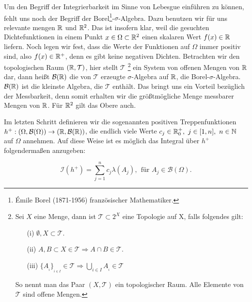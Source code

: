 Um den Begriff der Integrierbarkeit im Sinne von Lebesgue einführen zu können, fehlt uns noch der Begriff der Borel\footnote{Émile Borel (1871-1956)  französischer Mathematiker.}-$\sigma$-Algebra. Dazu benutzen wir für uns relevante mengen $\mathbb{R}$ und $\mathbb{R}^2$. Das ist insofern klar, weil die gesuchten Dichtefunktionen in einem Punkt $x \in \Omega \subset \mathbb{R}^2$ einen skalaren Wert $f(x) \in \mathbb{R}$ liefern. Noch legen wir fest, dass die Werte der Funktionen auf $\Omega$ immer positiv sind, also $f(x) \in \mathbb{R}^+$, denn es gibt keine negativen Dichten. Betrachten wir den topologischen Raum $(\mathbb{R},\mathcal{T})$, hier stellt $\mathcal{T}$ \footnote{
Sei $X$ eine Menge, dann ist $\mathcal{T} \subset 2^{X}$ eine Topologie auf X, falls folgendes gilt:
\begin{itemize}
	\item[(i)] $\emptyset , X \subset \mathcal{T}$. 
	\item[(ii)] $ A,B \subset X \in \mathcal{T} \Rightarrow A \cap B \in \mathcal{T}$.
	\item[(iii)] $\{ A_{_i}\}_{_{i \in I}} \in \mathcal{T} \Rightarrow \bigcup\limits_{i \in I} A_{_i} \in \mathcal{T}$ 
\end{itemize}
So nennt man das Paar $(X, \mathcal{T})$ ein topologischer Raum. Alle Elemente von $\mathcal{T}$ sind offene Mengen.}
ein System von offenen Mengen von $\mathbb{R}$ dar, dann heißt $\mathcal{B}(\mathbb{R})$ die von $\mathcal{T}$ erzeugte $\sigma$-Algebra auf $\mathbb{R}$, die Borel-$\sigma$-Algebra. $\mathcal{B}(\mathbb{R})$ ist die kleinste Algebra, die $\mathcal{T}$ enthält. Das bringt uns ein Vorteil bezüglich der Messbarkeit, denn somit erhalten wir die größtmögliche Menge messbarer Mengen von $\mathbb{R}$. Für $\mathbb{R}^2$ gilt das Obere auch.

Im letzten Schritt definieren wir die sogenannten positiven Treppenfunktionen $h^+:(\Omega, \mathcal{B}(\Omega)) \rightarrow (\mathbb{R}, \mathcal{B}(\mathbb{R}))$, die endlich viele Werte $c_j \in \mathbb{R}_{0}^{+}, \ j \in [1,n], \ n \in \mathbb{N}$ auf $\Omega$ annehmen. Auf diese Weise ist es möglich das Integral über $h^+$ folgendermaßen anzugeben:

\[ \mathcal{I}(h^+) = \sum\limits_{j = 1}^{n} c_j \lambda({A_j}), \ \ \mbox{für } A_j \in \mathcal{B}(\Omega).\]

